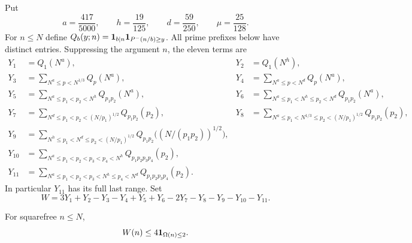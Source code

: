 Put
\[
 a=\frac{417}{5000},\qquad h=\frac{19}{125},\qquad
 d=\frac{59}{250},\qquad \mu=\frac{25}{128}.
\]
For $n\le N$ define
$Q_b(y;n)={\bf1}_{b\mid n}{\bf1}_{P^-(n/b)\ge y}$.
All prime prefixes below have distinct entries.  Suppressing the
argument $n$, the eleven terms are
\begin{align*}
 Y_1&=Q_1(N^a),&Y_2&=Q_1(N^h),\\
 Y_3&=\sum_{N^a\le p<N^{1/3}}Q_p(N^a),&
 Y_4&=\sum_{N^a\le p<N^d}Q_p(N^a),\\
 Y_5&=\sum_{N^a\le p_1<p_2<N^h}Q_{p_1p_2}(N^a),&
 Y_6&=\sum_{N^a\le p_1<N^h\le p_2<N^d}Q_{p_1p_2}(N^a),\\
 Y_7&=\sum_{N^d\le p_1<p_2<(N/p_1)^{1/2}}Q_{p_1p_2}(p_2),&
 Y_8&=\sum_{N^a\le p_1<N^{1/3}\le p_2<(N/p_1)^{1/2}}
                                          Q_{p_1p_2}(p_2),\\
 Y_9&=\sum_{N^h\le p_1<N^d\le p_2<(N/p_1)^{1/2}}
                   Q_{p_1p_2}\bigl((N/(p_1p_2))^{1/2}\bigr),\\
 Y_{10}&=\sum_{N^a\le p_1<p_2<p_3<p_4<N^h}Q_{p_1p_2p_3p_4}(p_2),\\
 Y_{11}&=\sum_{N^a\le p_1<p_2<p_3<N^h\le p_4<N^d}
                                          Q_{p_1p_2p_3p_4}(p_2).
\end{align*}
In particular $Y_{11}$ has its full last range.  Set
\begin{equation}
 W=3Y_1+Y_2-Y_3-Y_4+Y_5+Y_6-2Y_7-Y_8-Y_9-Y_{10}-Y_{11}.
 \label{eq:current-full-weight}
\end{equation}

\begin{lemma}
\label{lem:current-full-weight}
For squarefree $n\le N$,
\[
                  W(n)\le4{\bf1}_{\Omega(n)\le2}.
\]
\end{lemma}

